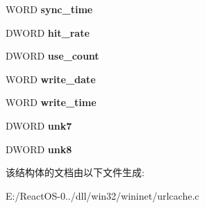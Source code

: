 \begin{DoxyCompactItemize}
W\+O\+RD {\bfseries sync\+\_\+time}
\item 
\mbox{\label{structentry__url_a3205a1ff90addb76c7b0fee84854ec11}} 
D\+W\+O\+RD {\bfseries hit\+\_\+rate}
\item 
\mbox{\label{structentry__url_a9c91edba394a0bb9194e362776117d66}} 
D\+W\+O\+RD {\bfseries use\+\_\+count}
\item 
\mbox{\label{structentry__url_a10b0b5da97257f13d7fe08ecc7d91093}} 
W\+O\+RD {\bfseries write\+\_\+date}
\item 
\mbox{\label{structentry__url_a00560baa87662f0b78ad1016842c2434}} 
W\+O\+RD {\bfseries write\+\_\+time}
\item 
\mbox{\label{structentry__url_a4a00cd67e225709fe5c0da3ea772b864}} 
D\+W\+O\+RD {\bfseries unk7}
\item 
\mbox{\label{structentry__url_aebee1087b631694505fdc44699f92ef6}} 
D\+W\+O\+RD {\bfseries unk8}
\end{DoxyCompactItemize}


该结构体的文档由以下文件生成\+:\begin{DoxyCompactItemize}
\item 
E\+:/\+React\+O\+S-\/0../dll/win32/wininet/urlcache.\+c\end{DoxyCompactItemize}
